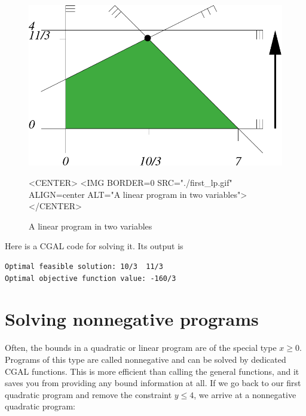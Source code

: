 \begin{figure}[htbp]
\begin{ccTexOnly}
\begin{center}
\includegraphics{QP_solver/first_lp} %
\end{center}
\end{ccTexOnly}
\caption{A linear program in two variables
\label{fig:QP-first_lp}}

\begin{ccHtmlOnly}
<CENTER>
<IMG BORDER=0 SRC="./first_lp.gif" ALIGN=center ALT="A linear program in two variables">
</CENTER>
\end{ccHtmlOnly}
\end{figure}

Here is a CGAL code for solving it. Its output is
\begin{verbatim}
Optimal feasible solution: 10/3  11/3
Optimal objective function value: -160/3
\end{verbatim}


\section{Solving nonnegative programs}\label{sec:QP-nonnegative}

Often, the bounds in a quadratic or linear program are of the special
type $x\geq 0$. Programs of this type are called nonnegative and
can be solved by dedicated CGAL functions. This is more efficient than
calling the general functions, and it saves you from providing any bound
information at all. If we go back to our first quadratic program and
remove the constraint $y\leq 4$, we arrive at a nonnegative quadratic
program: 

